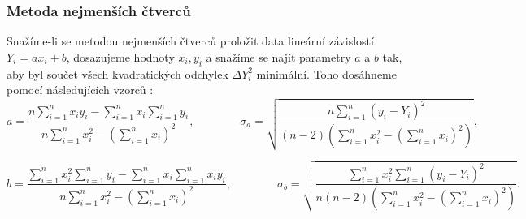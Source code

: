 \documentclass[english]{article}
\begin{document}
\subsubsection{Metoda nejmenších čtverců}
Snažíme-li se metodou nejmenších čtverců proložit data lineární závislostí $Y_i = ax_i+b$, dosazujeme hodnoty $x_i, y_i$ a snažíme se najít parametry $a$ a $b$ tak, aby byl součet všech kvadratických odchylek $\Delta Y_i^2$ minimální. Toho dosáhneme pomocí následujících vzorců \cite{bib:ctverce} :
\begin{equation}\label{eq:ctverce_a}
		a = \frac{n\sum\limits_{i=1}^{n}{x_i y_i}  - \sum\limits_{i=1}^{n}{x_i}\sum\limits_{i=1}^{n}{y_i}}{n\sum\limits_{i=1}^{n}{x_i^2}  - \left(\sum\limits_{i=1}^{n}{x_i}\right)^2}, \qquad \qquad
		\sigma_a = \sqrt{\frac{n\sum\limits_{i=1}^{n}{(y_i - Y_i)^2} }{(n-2)\left(\sum\limits_{i=1}^{n}{x_i^2}  - \left(\sum\limits_{i=1}^{n}{x_i}\right)^2\right)}},
\end{equation}

\begin{equation}\label{eq:ctverce_b}
		b = \frac{\sum\limits_{i=1}^{n}{x_i^2} \sum\limits_{i=1}^{n}{y_i}  - \sum\limits_{i=1}^{n}{x_i}\sum\limits_{i=1}^{n}{x_i y_i}}{n\sum\limits_{i=1}^{n}{x_i^2}  - \left(\sum\limits_{i=1}^{n}{x_i}\right)^2}, \qquad \qquad
		\sigma_b = \sqrt{\frac{\sum\limits_{i=1}^{n}{x_i^2}\sum\limits_{i=1}^{n}{(y_i - Y_i)^2} }{n(n-2)\left(\sum\limits_{i=1}^{n}{x_i^2}  - \left(\sum\limits_{i=1}^{n}{x_i}\right)^2\right)}}.
\end{equation}
	
\clearpage
\end{document}
